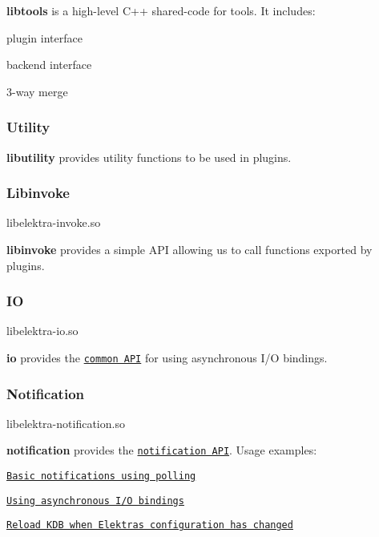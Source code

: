 {\bfseries libtools} is a high-\/level C++ shared-\/code for tools. It includes\+:


\begin{DoxyItemize}
\item plugin interface
\item backend interface
\item 3-\/way merge
\end{DoxyItemize}

\subsubsection*{Utility}

{\bfseries libutility} provides utility functions to be used in plugins.

\subsubsection*{Libinvoke}

\begin{DoxyVerb}libelektra-invoke.so
\end{DoxyVerb}


{\bfseries libinvoke} provides a simple A\+PI allowing us to call functions exported by plugins.

\subsubsection*{IO}

\begin{DoxyVerb}libelektra-io.so
\end{DoxyVerb}


{\bfseries io} provides the \href{https://doc.libelektra.org/api/current/html/group__kdbio.html}{\tt common A\+PI} for using asynchronous I/O bindings.

\subsubsection*{Notification}

\begin{DoxyVerb}libelektra-notification.so
\end{DoxyVerb}


{\bfseries notification} provides the \href{https://doc.libelektra.org/api/current/html/group__kdbnotification.html}{\tt notification A\+PI}. Usage examples\+:


\begin{DoxyItemize}
\item \href{https://www.libelektra.org/examples/notificationpolling}{\tt Basic notifications using polling}
\item \href{https://www.libelektra.org/examples/notificationasync}{\tt Using asynchronous I/O bindings}
\item \href{https://www.libelektra.org/examples/notificationreload}{\tt Reload K\+DB when Elektra\textquotesingle{}s configuration has changed} 
\end{DoxyItemize}